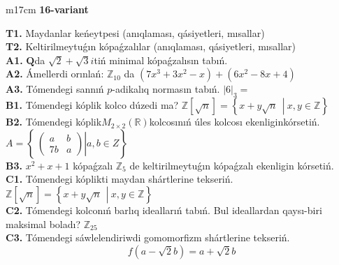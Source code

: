 \documentclass{article}
\begin{document}
\begin{tabular}{m{17cm}}
\textbf{16-variant}
\newline

\textbf{T1.} Maydanlar keńeytpesi (anıqlaması, qásiyetleri, mısallar) \\
\textbf{T2.} Keltirilmeytuǵın kópaǵzalılar (anıqlaması, qásiyetleri, mısallar) \\
\textbf{A1.} \(\mathbf{Q}\)da \(\sqrt{2} + \sqrt{3}i\)tiń minimal kópaǵzalısın tabıń. \\
\textbf{A2.} Ámellerdi orınlań: \(\mathbb{Z}_{10}\) da \(\left( 7x^{3} + 3x^{2} - x \right) + \left( 6x^{2} - 8x + 4 \right)\) \\
\textbf{A3.} Tómendegi sannıń \(p\)-adikalıq normasın tabıń. \(|6|_{3} =\) \\
\textbf{B1.} Tómendegi kóplik kolco dúzedi ma? \(\mathbb{Z}\left\lbrack \sqrt{n} \right\rbrack = \left\{ x + y\sqrt{n}\ \ \left| \right.\ x,y \in \mathbb{Z} \right\}\) \\
\textbf{B2.} Tómendegi kóplik\(M_{2 \times 2}\left( \mathbb{R} \right)\)kolcosınıń úles kolcosı ekenliginkórsetiń. \(A = \left\{ \left. \ \begin{pmatrix}
a & b \\
7b & a
\end{pmatrix} \right|a,b \in Z \right\}\) \\
\textbf{B3.} \(x^{2} + x + 1\) kópaǵzalı \(\mathbb{Z}_{5}\) de keltirilmeytuǵın kópaǵzalı ekenligin kórsetiń. \\
\textbf{C1.} Tómendegi kóplikti maydan shártlerine tekseriń. \(\mathbb{Z}\left\lbrack \sqrt{n} \right\rbrack = \left\{ x + y\sqrt{n}\ \ \left| \right.\ x,y \in \mathbb{Z} \right\}\) \\
\textbf{C2.} Tómendegi kolconıń barlıq ideallarıń tabıń. Bul ideallardan qaysı-biri maksimal boladı? \(\mathbb{Z}_{25}\) \\
\textbf{C3.} Tómendegi sáwlelendiriwdi gomomorfizm shártlerine tekseriń.
\[f\left( a - \sqrt{2}b \right) = a + \sqrt{2}b\] \\

\end{tabular}
\vspace{1cm}
\end{document}
